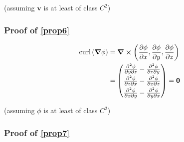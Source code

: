 \documentclass{article}
\renewcommand{\vec}[1]{\boldsymbol{#1}}
\begin{document}
(assuming \( \vec{v} \) is at least of class \( C^{2} \))

\subsubsection{Proof of \eqref{prop6}}

\begin{align*}
    \text{curl}\left(\grad{\phi}\right) &= \curl \left( \frac{\partial{ \phi }}{\partial{ x }} , \frac{\partial{ \phi }}{\partial{ y }} , \frac{\partial{ \phi }}{\partial{ z }} \right) \\
    &= \begin{pmatrix} \frac{\partial^{2} { \phi }}{\partial{ y \partial{ z } }} - \frac{\partial^{2} { \phi }}{\partial{ z \partial{ y } }} \\[0.3em] \frac{\partial^{2} { \phi }}{\partial{ z \partial{ x } }} - \frac{\partial^{2} { \phi }}{\partial{ x \partial{ z } }} \\[0.3em] \frac{\partial^{2} { \phi }}{\partial{ x \partial{ y } }} - \frac{\partial^{2} { \phi }}{\partial{ y \partial{ x } }} \end{pmatrix} = \vec{0} \\
\end{align*}


(assuming \( \phi \) is at least of class \( C^{2} \))

\subsubsection{Proof of \eqref{prop7}}
\end{document}
